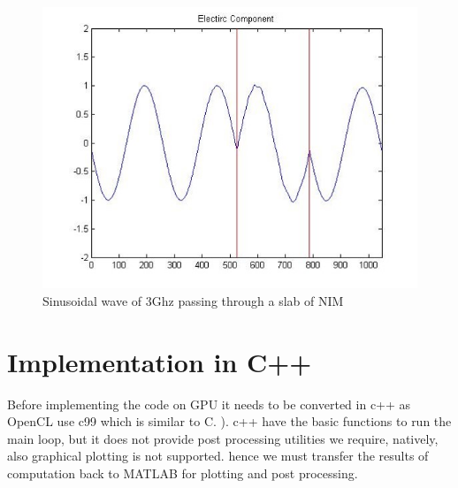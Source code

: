 \begin{figure}[H]
	\centering
		\includegraphics[width=5in]{Figures/drude2.jpg}
	\caption[Sinusoidal wave passing through DNG slab]{Sinusoidal wave of 3Ghz passing through a slab of NIM}
	\label{drude2}
\end{figure}

\section{Implementation in C++}
Before implementing the code on GPU it needs to be converted in c++ as OpenCL use c99 which is similar to C.
). c++ have the basic functions to run the main loop, but it does not provide post processing utilities we require, natively, also graphical plotting is not supported. hence we must transfer the results of computation back to MATLAB for plotting and post processing.
